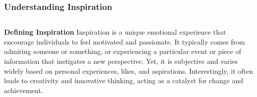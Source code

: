 \documentclass[5pt]{beamer}
\begin{document}
\begin{frame}
\frametitle{Understanding Inspiration}
\begin{columns}
\begin{column}{0.7\textwidth}
\begin{block}{\textbf{Defining Inspiration}}
Inspiration is a unique emotional experience that encourage individuals to feel motivated and passionate. It typically comes from admiring someone or something, or experiencing a particular event or piece of information that instigates a new perspective. Yet, it is subjective and varies widely based on personal experiences, likes, and aspirations. Interestingly, it often leads to creativity and innovative thinking, acting as a catalyst for change and achievement.
\end{block}
\end{column}
\end{columns}
\end{frame}
\end{document}
